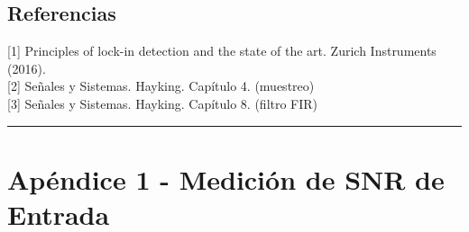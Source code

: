 \documentclass[11pt,a4paper]{extarticle}
\begin{document}
\begin{multicols}{2}
\section{Referencias}
[1] Principles of lock-in detection
and the state of the art. Zurich Instruments (2016).\\

[2] Señales y Sistemas. Hayking. Capítulo 4. (muestreo)\\

[3] Señales y Sistemas. Hayking. Capítulo 8. (filtro FIR)



\end{multicols}
\newpage
\begin{appendices}
\vspace{-1em}
\hrule
\vspace{1em}
\normalsize
\section{Apéndice 1 - Medición de SNR de Entrada}
\end{appendices}
\end{document}
